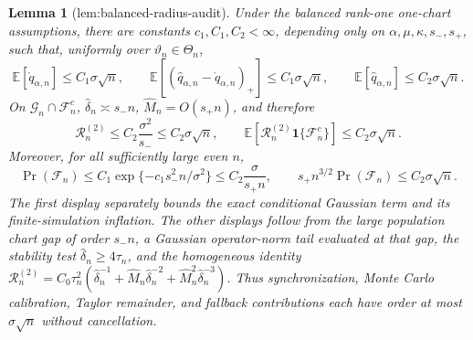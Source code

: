 \documentclass{article}
\newtheorem{lemma}{Lemma}
\begin{document}
\begin{lemma}[lem:balanced-radius-audit]\label{lem:balanced-radius-audit}
Under the balanced rank-one one-chart assumptions, there are constants \(c_1,C_1,C_2<\infty\), depending only on \(\alpha,\mu,\kappa,s_-,s_+\), such that, uniformly over \(\vartheta_n\in\Theta_n\), \[\mathbb E[\mathring q_{\alpha,n}]\le C_1\sigma\sqrt n,\qquad \mathbb E[(\widehat q_{\alpha,n}-\mathring q_{\alpha,n})_+]\le C_1\sigma\sqrt n,\qquad \mathbb E[\widehat q_{\alpha,n}]\le C_2\sigma\sqrt n.\] On \(\mathcal G_n\cap\mathcal F_n^c\), \(\widehat\delta_n\asymp s_-n\), \(\widehat M_n=O(s_+n)\), and therefore \[\mathscr R_n^{(2)}\le C_2\frac{\sigma^2}{s_-}\le C_2\sigma\sqrt n,\qquad \mathbb E[\mathscr R_n^{(2)}\mathbf 1\{\mathcal F_n^c\}]\le C_2\sigma\sqrt n.\] Moreover, for all sufficiently large even \(n\), \[\Pr(\mathcal F_n)\le C_1\exp\{-c_1s_-^2n/\sigma^2\}\le C_2\frac{\sigma}{s_+n},\qquad s_+n^{3/2}\Pr(\mathcal F_n)\le C_2\sigma\sqrt n.\] The first display separately bounds the exact conditional Gaussian term and its finite-simulation inflation. The other displays follow from the large population chart gap of order \(s_-n\), a Gaussian operator-norm tail evaluated at that gap, the stability test \(\widehat\delta_n\ge4\tau_n\), and the homogeneous identity \(\mathscr R_n^{(2)}=C_0\tau_n^2(\widehat\delta_n^{-1}+\widehat M_n\widehat\delta_n^{-2}+\widehat M_n^2\widehat\delta_n^{-3})\). Thus synchronization, Monte Carlo calibration, Taylor remainder, and fallback contributions each have order at most \(\sigma\sqrt n\) without cancellation.
\end{lemma}
\end{document}
